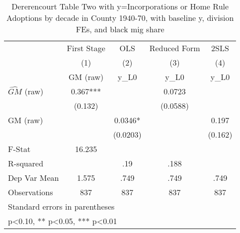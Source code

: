 \begin{table}[htbp]\centering
\def\sym#1{\ifmmode^{#1}\else\(^{#1}\)\fi}
\caption{Dererencourt Table Two with y=Incorporations or Home Rule Adoptions by decade in County 1940-70, with baseline y, division FEs, and black mig share}
\begin{tabular}{l*{4}{c}}
\toprule
                    & First Stage   &         OLS   &Reduced Form   &        2SLS   \\
                    &\multicolumn{1}{c}{(1)}&\multicolumn{1}{c}{(2)}&\multicolumn{1}{c}{(3)}&\multicolumn{1}{c}{(4)}\\
                    &\multicolumn{1}{c}{GM  (raw)}&\multicolumn{1}{c}{y\_L0}&\multicolumn{1}{c}{y\_L0}&\multicolumn{1}{c}{y\_L0}\\
\midrule
$\hat{GM}$ (raw)    &       0.367***&               &      0.0723   &               \\
                    &     (0.132)   &               &    (0.0588)   &               \\
\addlinespace
GM  (raw)           &               &      0.0346*  &               &       0.197   \\
                    &               &    (0.0203)   &               &     (0.162)   \\
\midrule
F-Stat              &      16.235   &               &               &               \\
R-squared           &               &         .19   &        .188   &               \\
Dep Var Mean        &       1.575   &        .749   &        .749   &        .749   \\
Observations        &         837   &         837   &         837   &         837   \\
\bottomrule
\multicolumn{5}{l}{\footnotesize Standard errors in parentheses}\\
\multicolumn{5}{l}{\footnotesize * p<0.10, ** p<0.05, *** p<0.01}\\
\end{tabular}
\end{table}
